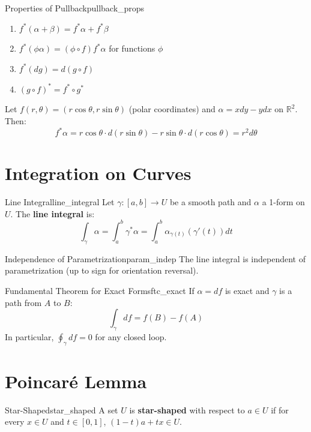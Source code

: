 \documentclass[11pt, letterpaper, openany]{book}
\begin{document}
\begin{thm}{Properties of Pullback}{pullback_props}
\begin{enumerate}
    \item $f^*(\alpha + \beta) = f^*\alpha + f^*\beta$
    \item $f^*(\phi \alpha) = (\phi \circ f) f^*\alpha$ for functions $\phi$
    \item $f^*(dg) = d(g \circ f)$
    \item $(g \circ f)^* = f^* \circ g^*$
\end{enumerate}
\end{thm}

\begin{example}
Let $f(r, \theta) = (r\cos\theta, r\sin\theta)$ (polar coordinates) and $\alpha = x dy - y dx$ on $\mathbb{R}^2$. Then:
\[
f^*\alpha = r\cos\theta \cdot d(r\sin\theta) - r\sin\theta \cdot d(r\cos\theta) = r^2 d\theta
\]
\end{example}

\section{Integration on Curves}

\begin{defn}{Line Integral}{line_integral}
Let $\gamma: [a,b] \to U$ be a smooth path and $\alpha$ a 1-form on $U$. The \textbf{line integral} is:
\[
\int_\gamma \alpha = \int_a^b \gamma^*\alpha = \int_a^b \alpha_{\gamma(t)}(\gamma'(t)) dt
\]
\end{defn}

\begin{thm}{Independence of Parametrization}{param_indep}
The line integral is independent of parametrization (up to sign for orientation reversal).
\end{thm}

\begin{thm}{Fundamental Theorem for Exact Forms}{ftc_exact}
If $\alpha = df$ is exact and $\gamma$ is a path from $A$ to $B$:
\[
\int_\gamma df = f(B) - f(A)
\]
In particular, $\oint_\gamma df = 0$ for any closed loop.
\end{thm}

\section{Poincaré Lemma}

\begin{defn}{Star-Shaped}{star_shaped}
A set $U$ is \textbf{star-shaped} with respect to $a \in U$ if for every $x \in U$ and $t \in [0,1]$, $(1-t)a + tx \in U$.
\end{defn}
\end{document}
